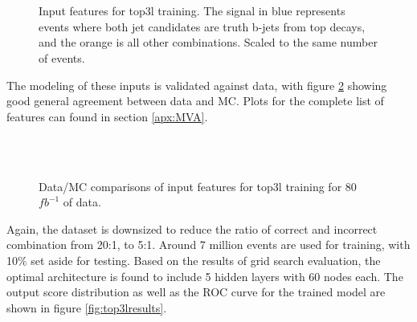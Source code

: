 \begin{figure}[h!]
    \\
    \\
    \caption{Input features for top3l training. The signal in blue represents events where both jet candidates are truth b-jets from top decays, and the orange is all other combinations. Scaled to the same number of events.}
    \label{fig:features_top3l}
\end{figure}

The modeling of these inputs is validated against data, with figure \ref{fig:model_top3l} showing good general agreement between data and MC. Plots for the complete list of features can found in section \ref{apx:MVA}.

\begin{figure}[h!]                                                                                                         
    \\
    \\
    \caption{Data/MC comparisons of input features for top3l training for 80 $fb^{-1}$ of data.}
    \label{fig:model_top3l}
\end{figure}

Again, the dataset is downsized to reduce the ratio of correct and incorrect combination from 20:1, to 5:1. Around 7 million events are used for training, with 10\% set aside for testing. Based on the results of grid search evaluation, the optimal architecture is found to include 5 hidden layers with 60 nodes each. The output score distribution as well as the ROC curve for the trained model are shown in figure \ref{fig:top3lresults}.

